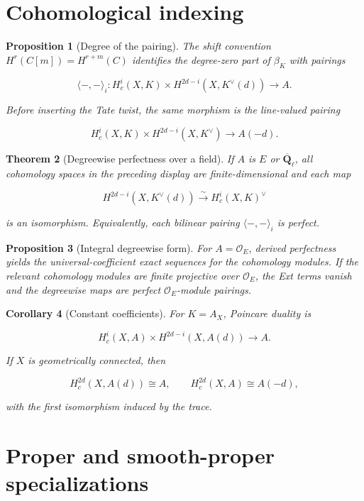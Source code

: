\documentclass[10pt]{article}
\newtheorem{theorem}{Theorem}[section]
\newtheorem{proposition}[theorem]{Proposition}
\newtheorem{corollary}[theorem]{Corollary}
\theoremstyle{definition}
\newcommand{\Qlb}{\overline{\mathbf Q}_\ell}
\newcommand{\OO}{\mathcal O}
\begin{document}
\section{Cohomological indexing}

\begin{proposition}[Degree of the pairing]
The shift convention \(H^r(C[m])=H^{r+m}(C)\) identifies the degree-zero
part of \(\beta_K\) with pairings

\[
 \langle-,-\rangle_i:
 H_c^i(X,K)\times
 H^{2d-i}(X,K^\vee(d))\longrightarrow A.
\]

Before inserting the Tate twist, the same morphism is the line-valued
pairing

\[
 H_c^i(X,K)\times H^{2d-i}(X,K^\vee)
 \longrightarrow A(-d).
\]
\end{proposition}

\begin{theorem}[Degreewise perfectness over a field]
If \(A\) is \(E\) or \(\Qlb\), all cohomology spaces in the preceding display
are finite-dimensional and each map

\[
 H^{2d-i}(X,K^\vee(d))
 \xrightarrow{\sim}H_c^i(X,K)^\vee
\]

is an isomorphism.  Equivalently, each bilinear pairing
\(\langle-,-\rangle_i\) is perfect.
\end{theorem}

\begin{proposition}[Integral degreewise form]
For \(A=\OO_E\), derived perfectness yields the universal-coefficient exact
sequences for the cohomology modules.  If the relevant cohomology modules
are finite projective over \(\OO_E\), the Ext terms vanish and the
degreewise maps are perfect \(\OO_E\)-module pairings.
\end{proposition}

\begin{corollary}[Constant coefficients]
For \(K=A_X\), Poincare duality is

\[
 H_c^i(X,A)\times H^{2d-i}(X,A(d))\longrightarrow A.
\]

If \(X\) is geometrically connected, then

\[
 H_c^{2d}(X,A(d))\cong A,
 \qquad
 H_c^{2d}(X,A)\cong A(-d),
\]

with the first isomorphism induced by the trace.
\end{corollary}

\section{Proper and smooth-proper specializations}
\end{document}
